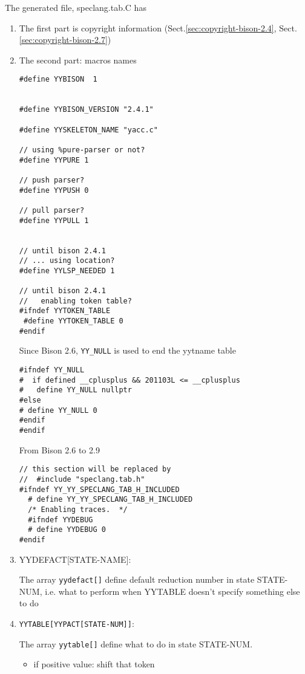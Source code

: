 The generated file, speclang.tab.C has 
\begin{enumerate}
  \item  The first part is copyright information (Sect.\ref{sec:copyright-bison-2.4}, Sect.\ref{sec:copyright-bison-2.7})

  \item The second part: macros names
  
\begin{verbatim}
#define YYBISON  1 


#define YYBISON_VERSION "2.4.1"

#define YYSKELETON_NAME "yacc.c"

// using %pure-parser or not?
#define YYPURE 1

// push parser?
#define YYPUSH 0

// pull parser?
#define YYPULL 1


// until bison 2.4.1
// ... using location?
#define YYLSP_NEEDED 1

// until bison 2.4.1
//   enabling token table?
#ifndef YYTOKEN_TABLE
 #define YYTOKEN_TABLE 0
#endif
\end{verbatim}

Since Bison 2.6, \verb!YY_NULL! is used to end the yytname table 
\begin{verbatim}
#ifndef YY_NULL
#  if defined __cplusplus && 201103L <= __cplusplus  
#   define YY_NULL nullptr 
#else
# define YY_NULL 0
#endif
#endif
\end{verbatim}


From Bison 2.6 to 2.9
\begin{verbatim}
// this section will be replaced by 
//  #include "speclang.tab.h"
#ifndef YY_YY_SPECLANG_TAB_H_INCLUDED
  # define YY_YY_SPECLANG_TAB_H_INCLUDED
  /* Enabling traces.  */
  #ifndef YYDEBUG
  # define YYDEBUG 0
#endif
\end{verbatim}

   \item YYDEFACT[STATE-NAME]:  
   
The array \verb!yydefact[]! define default reduction number in state STATE-NUM, i.e.
what to perform when YYTABLE doesn't specify something else to do


   \item \verb!YYTABLE[YYPACT[STATE-NUM]]!:
   
The array \verb!yytable[]! define what to do in state STATE-NUM. 
\begin{itemize}
  \item if positive value: shift that token
  

\end{itemize}
\end{enumerate}
